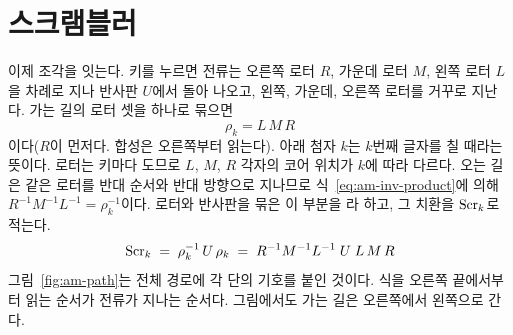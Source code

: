 \section{스크램블러}\label{sec:am-scrambler}

이제 조각을 잇는다. 키를 누르면 전류는 오른쪽 로터 $R$, 가운데 로터 $M$, 왼쪽 로터 $L$을 차례로 지나 반사판
$U$에서 돌아 나오고, 왼쪽, 가운데, 오른쪽 로터를 거꾸로 지난다. 가는 길의 로터 셋을 하나로 묶으면
\[
  \rho_k = L\,M\,R
\]
이다($R$이 먼저다. 합성은 오른쪽부터 읽는다). 아래 첨자 $k$는 $k$번째 글자를 칠 때라는 뜻이다. 로터는 키마다 도므로
$L$, $M$, $R$ 각자의 코어 위치가 $k$에 따라 다르다. 오는 길은 같은 로터를 반대 순서와 반대 방향으로 지나므로
식~\eqref{eq:am-inv-product}에 의해 $R^{-1}M^{-1}L^{-1} = \rho_k^{-1}$이다. 로터와 반사판을 묶은 이 부분을
라 하고, 그 치환을 $\mathrm{Scr}_k$로 적는다.
\begin{equation}
  \mathrm{Scr}_k \;=\; \rho_k^{-1}\, U\, \rho_k \;=\; R^{-1}M^{-1}L^{-1}\; U\; L\,M\,R \label{eq:am-scr}
\end{equation}
그림~\ref{fig:am-path}는 전체 경로에 각 단의 기호를 붙인 것이다. 식을 오른쪽 끝에서부터 읽는 순서가 전류가 지나는
순서다. 그림에서도 가는 길은 오른쪽에서 왼쪽으로 간다.

